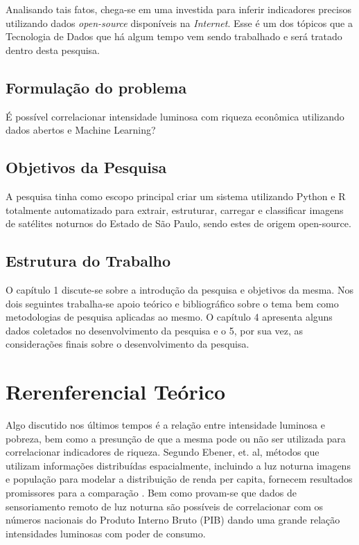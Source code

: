 \documentclass[]{article}
\begin{document}
Analisando tais fatos, chega-se em uma investida para inferir indicadores precisos utilizando dados \textit{open-source}  disponíveis na \textit{Internet}. Esse é um dos tópicos que a Tecnologia de Dados que há algum tempo vem sendo trabalhado e será tratado dentro desta pesquisa.

\subsection{Formulação do problema}
É possível correlacionar intensidade luminosa com riqueza econômica utilizando dados abertos e Machine Learning?

\subsection{Objetivos da Pesquisa}
A pesquisa tinha como escopo principal criar um sistema utilizando Python e R totalmente automatizado para extrair, estruturar, carregar e classificar imagens de satélites noturnos do Estado de São Paulo, sendo estes de origem open-source.

\subsection{Estrutura do Trabalho}
O capítulo 1 discute-se sobre a introdução da pesquisa e objetivos da mesma. Nos dois seguintes trabalha-se apoio teórico e bibliográfico sobre o tema bem como metodologias de pesquisa aplicadas ao mesmo. O capítulo 4 apresenta alguns dados coletados no desenvolvimento da pesquisa e o 5, por sua vez, as considerações finais sobre o desenvolvimento da pesquisa.

\pagebreak


\section{Rerenferencial Teórico}
\label{s.referencia_teorico}
Algo discutido nos últimos tempos é a relação entre intensidade luminosa e pobreza, bem como a presunção de que a mesma pode ou não ser utilizada para correlacionar indicadores de riqueza. Segundo Ebener, et. al, métodos que utilizam informações distribuídas espacialmente, incluindo a luz noturna imagens e população para modelar a distribuição de renda per capita, fornecem resultados promissores para a comparação \cite{ref_ebener}. Bem como provam-se que dados de sensoriamento remoto de luz noturna são possíveis de correlacionar com os números nacionais do Produto Interno Bruto (PIB) dando uma grande relação intensidades luminosas com poder de consumo\cite{ref_mapping_dmsp}.
\end{document}
